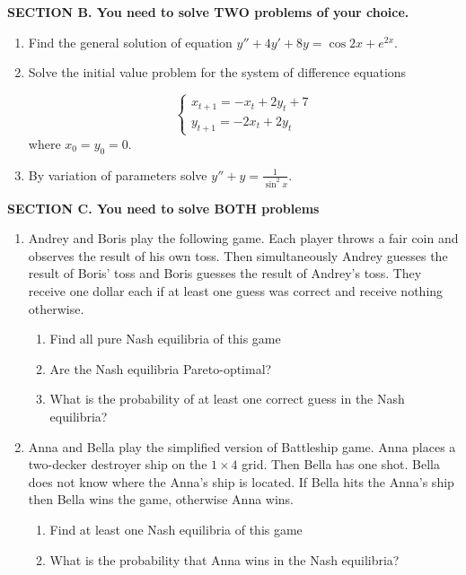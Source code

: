 \documentclass[12pt,a4paper]{article}
\begin{document}
\textbf{SECTION B. You need to solve TWO problems of your choice. }

\begin{enumerate}[resume]

\item Find the general solution of equation $y''+4y'+8y=\cos 2x + e^{2x}$.

\item Solve the initial value problem for the system of difference equations

\[
\begin{cases}
x_{t+1}=-x_t+2y_t+7 \\
y_{t+1}=-2x_t+2y_t
\end{cases}
\]
where $x_0=y_0=0$.

\item By variation of parameters solve $y''+y=\frac{1}{\sin^2 x}$.

\end{enumerate}

\textbf{SECTION C. You need to solve BOTH problems }

\begin{enumerate}[resume]

\item Andrey and Boris play the following game. Each player throws a fair coin and observes the result of his own toss. Then simultaneously Andrey guesses the result of Boris' toss and Boris guesses the result of Andrey's toss. They receive one dollar each if at least one guess was correct and receive nothing otherwise. 

\begin{enumerate}
\item Find all pure Nash equilibria of this game
\item Are the Nash equilibria Pareto-optimal?
\item What is the probability of at least one correct guess in the Nash equilibria?
\end{enumerate}

\item Anna and Bella play the simplified version of Battleship game. Anna places a two-decker destroyer ship on the $1\times 4$ grid. Then Bella has one shot. Bella does not know where the Anna's ship is located. If Bella hits the Anna's ship then Bella wins the game, otherwise Anna wins. 

\begin{enumerate}
\item Find at least one Nash equilibria of this game
\item What is the probability that Anna wins in the Nash equilibria?
\end{enumerate}


\end{enumerate}
\end{document}

